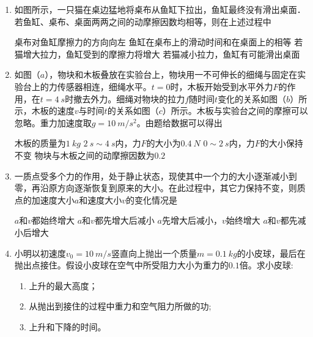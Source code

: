 
\begin{enumerate}[leftmargin=0em]
\renewcommand{\labelenumi}{\arabic{enumi}.}


\item 
{}
如图所示，一只猫在桌边猛地将桌布从鱼缸下拉出，鱼缸最终没有滑出桌面．若鱼缸、桌布、桌面两两之间的动摩擦因数均相等，则在上述过程中 
\begin{figure}[h!]
\centering

\end{figure}

\fourchoices
{桌布对鱼缸摩擦力的方向向左}
{鱼缸在桌布上的滑动时间和在桌面上的相等}
{若猫增大拉力，鱼缸受到的摩擦力将增大}
{若猫减小拉力，鱼缸有可能滑出桌面}

\item 
{}
如图（$ a $），物块和木板叠放在实验台上，物块用一不可伸长的细绳与固定在实验台上的力传感器相连，细绳水平。$ t=0 $时，木板开始受到水平外力$ F $的作用，在$ t=4\ s $时撤去外力。细绳对物块的拉力$ f $随时间$ t $变化的关系如图（$ b $）所示，木板的速度$ v $与时间$ t $的关系如图（$ c $）所示。木板与实验台之间的摩擦可以忽略。重力加速度取$ g=10 \ m/s^{2} $。由题给数据可以得出 
\begin{figure}[h!]
\centering

\end{figure}


\fourchoices
{木板的质量为$ 1 \ kg $}
{$ 2\ s \sim 4\ s $内，力$ F $的大小为$ 0.4 \ N $}
{$ 0 \sim 2\ s $内，力$ F $的大小保持不变}
{物块与木板之间的动摩擦因数为$ 0.2 $}

\item 
{}
一质点受多个力的作用，处于静止状态，现使其中一个力的大小逐渐减小到零，再沿原方向逐渐恢复到原来的大小。在此过程中，其它力保持不变，则质点的加速度大小$ a $和速度大小$ v $的变化情况是 

\fourchoices
{$ a $和$ v $都始终增大}
{$ a $和$ v $都先增大后减小}
{$ a $先增大后减小，$ v $始终增大}
{$ a $和$ v $都先减小后增大}


\newpage	

\item
{}
小明以初速度$ v_0=10 \ m/s $竖直向上抛出一个质量$ m=0.1 \ kg $的小皮球，最后在抛出点接住。假设小皮球在空气中所受阻力大小为重力的$ 0.1 $倍。求小皮球:
\begin{enumerate}
\renewcommand{\labelenumi}{\arabic{enumi}.}
\item
上升的最大高度；
\item 
从抛出到接住的过程中重力和空气阻力所做的功;
\item 
上升和下降的时间。


\end{enumerate}
\end{enumerate}
